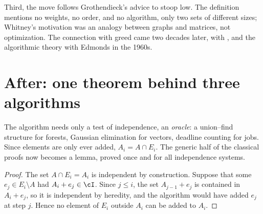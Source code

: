 \begin{refsection}
Third, the move follows Grothendieck's advice to stoop low. The definition mentions no weights, no order, and no algorithm, only two sets of different sizes; Whitney's motivation was an analogy between graphs and matrices, not optimization. The connection with greed came two decades later, with \textcite{Rado1957}, and the algorithmic theory with Edmonds in the 1960s.

\section{After: one theorem behind three algorithms}\label{sec:matroid:after1}


The algorithm needs only a test of independence, an \emph{oracle}: a union--find structure for forests, Gaussian elimination for vectors, deadline counting for jobs. Since elements are only ever added, $A_i=A\cap E_i$. The generic half of the classical proofs now becomes a lemma, proved once and for all independence systems.


\begin{proof}
The set $A\cap E_i=A_i$ is independent by construction. Suppose that some $e_j\in E_i\setminus A$ had $A_i+e_j\in\cI$. Since $j\le i$, the set $A_{j-1}+e_j$ is contained in $A_i+e_j$, so it is independent by heredity, and the algorithm would have added $e_j$ at step $j$. Hence no element of $E_i$ outside $A_i$ can be added to $A_i$.
\end{proof}


\end{refsection}
